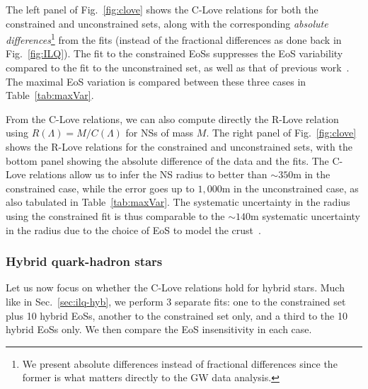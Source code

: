 \documentclass[prd,twocolumn,nofootinbib,superscriptaddress,amsmath,amssymb]{revtex4-1}
\begin{document}
The left panel of Fig.~\ref{fig:clove} shows the C-Love relations for both the constrained and unconstrained sets, along with the corresponding \emph{absolute differences}\footnote{We present absolute differences instead of fractional differences since the former is what matters directly to the GW data analysis.} from the fits (instead of the fractional differences as done back in Fig.~\ref{fig:ILQ}). The fit to the constrained EoSs suppresses the EoS variability compared to the fit to the unconstrained set, as well as that of previous work~\cite{Maselli:2013mva}. The maximal EoS variation is compared between these three cases in Table~\ref{tab:maxVar}.

From the C-Love relations, we can also compute directly the R-Love relation using $R(\Lambda)=M/C(\Lambda)$ for NSs of mass $M$. The right panel of Fig.~\ref{fig:clove} shows the R-Love relations for the constrained and unconstrained sets, with the bottom panel showing the absolute difference of the data and the fits. The C-Love relations allow us to infer the NS radius to better than $\sim 350 \textrm{m} $ in the constrained case, while the error goes up to $1,000 \textrm{m}$ in the unconstrained case, as also tabulated in Table~\ref{tab:maxVar}. The systematic uncertainty in the radius using the constrained fit is thus comparable to the $\sim 140\textrm{m}$ systematic uncertainty in the radius due to the choice of EoS to model the crust~\cite{Gamba:2019kwu}. 


\subsubsection{Hybrid quark-hadron stars}
\label{sec:clove-hyb}

Let us now focus on whether the C-Love relations hold for hybrid stars. Much like in Sec.~\ref{sec:ilq-hyb}, we perform 3 separate fits: one to the constrained set plus 10 hybrid EoSs, another to the constrained set only, and a third to the 10 hybrid EoSs only. We then compare the EoS insensitivity in each case.
\end{document}
